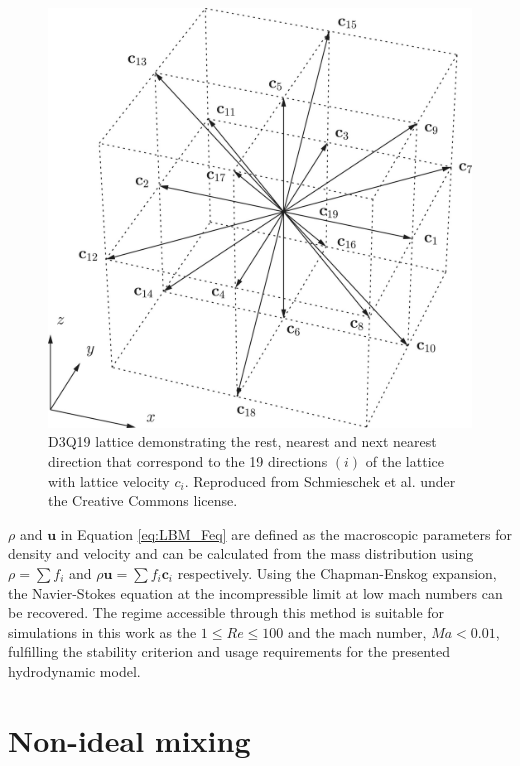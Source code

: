 \begin{figure}[h]
    \centering
    \includegraphics[scale = 0.7]{figures/methods/d3q19_lattice.jpg}
    \caption{D3Q19 lattice demonstrating the rest, nearest and next nearest direction that correspond to the 19 
    directions $(i)$ of the lattice with lattice velocity $c_{i}$. \cite{schmieschek_lb3d_2017} Reproduced from 
    Schmieschek et al. under the Creative Commons license.}
    \label{fig:d3q19_lattice}
\end{figure}

$\rho$ and $\textbf{u}$ in Equation \ref{eq:LBM_Feq} are defined as the macroscopic parameters for density and velocity 
and can be calculated from the mass distribution using $\rho = \sum f_i$ and $\rho \mathbf{u} = \sum f_i \mathbf{c}_i$ 
respectively. Using the Chapman-Enskog expansion, the Navier-Stokes equation at the incompressible limit at low mach
numbers can be recovered. \cite{qian_lattice_1992, he_lattice_1997} The regime accessible through this method is suitable 
for simulations in this work as the $ 1 \leq Re \leq 100 $ and the mach number, $Ma < 0.01$, fulfilling the stability 
criterion and usage requirements for the presented hydrodynamic model.

\section{Non-ideal mixing}
\label{section:lbm_non_ideal_mixing}

